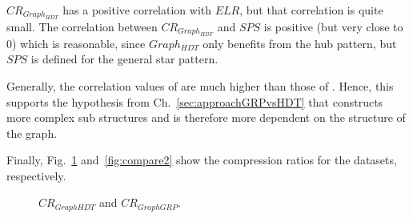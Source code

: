 $CR_{Graph_{HDT}}$ has a positive correlation with $ELR$, but that correlation is quite small. The correlation between $CR_{Graph_{HDT}}$ and $SPS$ is positive (but very close  to 0) which is reasonable, since $Graph_{HDT}$ only benefits from the hub pattern, but $SPS$ is defined for the general star pattern.

Generally, the correlation values of \GGRP{} are much higher than those of \GHDT{}. Hence, this supports the hypothesis from Ch.~\ref{sec:approachGRPvsHDT} that \GGRP{} constructs more complex sub structures and is therefore more dependent on the structure of the graph.

Finally, Fig.~\ref{fig:compare1} and~\ref{fig:compare2} show the compression ratios for the datasets, respectively.

\begin{figure}[h]
	\centering
	\hfill
	\caption{$CR_{Graph{HDT}}$ and $CR_{Graph{GRP}}$.}
	\label{fig:compare1}
\end{figure}

